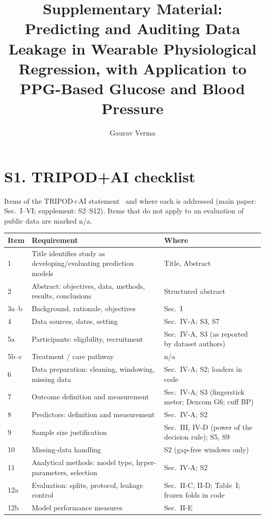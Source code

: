 \documentclass[journal,onecolumn]{IEEEtran}
\begin{document}
\title{Supplementary Material: Predicting and Auditing Data Leakage in
Wearable Physiological Regression, with Application to PPG-Based Glucose
and Blood Pressure}
\author{Gaurav Verma}
\maketitle

\section*{S1. TRIPOD+AI checklist}
Items of the TRIPOD+AI statement~\cite{collins2024tripod} and where each is
addressed (main paper: Sec.~I--VI; supplement: S2--S12).  Items that do not
apply to an evaluation of public data are marked n/a.

\begin{longtable}{@{}p{1.2cm}p{7.2cm}p{6.5cm}@{}}
\toprule
\textbf{Item} & \textbf{Requirement} & \textbf{Where} \\
\midrule
1 & Title identifies study as developing/evaluating prediction models & Title, Abstract \\
2 & Abstract: objectives, data, methods, results, conclusions & Structured abstract \\
3a--b & Background, rationale, objectives & Sec.~I \\
4 & Data sources, dates, setting & Sec.~IV-A; S3, S7 \\
5a & Participants: eligibility, recruitment & Sec.~IV-A, S3 (as reported by dataset authors) \\
5b--c & Treatment / care pathway & n/a \\
6 & Data preparation: cleaning, windowing, missing data & Sec.~IV-A; S2; loaders in code \\
7 & Outcome definition and measurement & Sec.~IV-A; S3 (fingerstick meter; Dexcom G6; cuff BP) \\
8 & Predictors: definition and measurement & Sec.~IV-A; S2 \\
9 & Sample size justification & Sec.~III, IV-D (power of the decision rule); S5, S9 \\
10 & Missing-data handling & S2 (gap-free windows only) \\
11 & Analytical methods: model type, hyper-parameters, selection & Sec.~IV-A; S2 \\
12a & Evaluation: splits, protocol, leakage control & Sec.~II-C, II-D; Table~I; frozen folds in code \\
12b & Model performance measures & Sec.~II-E \\

\end{longtable}
\end{document}
